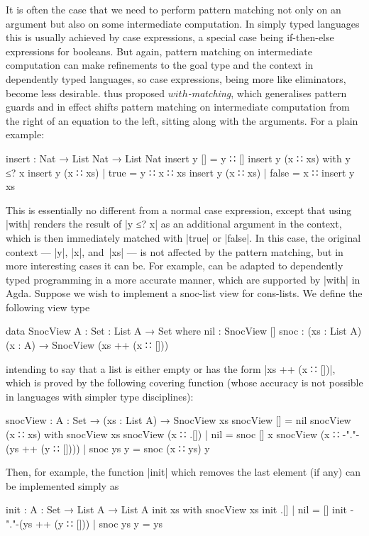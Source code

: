 It is often the case that we need to perform pattern matching not only on an argument but also on some intermediate computation.
In simply typed languages this is usually achieved by case expressions, a special case being if-then-else expressions for booleans.
But again, pattern matching on intermediate computation can make refinements to the goal type and the context in dependently typed languages, so case expressions, being more like eliminators, become less desirable.
\citet{McBride-view} thus proposed \emph{$with$-matching}, which generalises pattern guards and in effect shifts pattern matching on intermediate computation from the right of an equation to the left, sitting along with the arguments.
For a plain example:
\begin{code}
insert : Nat → List Nat → List Nat
insert y [] = y ∷ []
insert y (x ∷ xs) with y ≤? x
insert y (x ∷ xs) | true   = y ∷ x ∷ xs
insert y (x ∷ xs) | false  = x ∷ insert y xs
\end{code}
This is essentially no different from a normal case expression, except that using |with| renders the result of |y ≤? x| as an additional argument in the context, which is then immediately matched with |true| or |false|.
In this case, the original context --- |y|, |x|, and~|xs| --- is not affected by the pattern matching, but in more interesting cases it can be.
For example,  can be adapted to dependently typed programming in a more accurate manner, which are supported by |with| in Agda.
Suppose we wish to implement a snoc-list view for cons-lists.
We define the following view type
\begin{code}
data SnocView {A : Set} : List A → Set where
  nil   : SnocView []
  snoc  : (xs : List A) (x : A) → SnocView (xs ++ (x ∷ []))
\end{code}
intending to say that a list is either empty or has the form |xs ++ (x ∷ [])|, which is proved by the following covering function (whose accuracy is not possible in languages with simpler type disciplines):
\begin{code}
snocView : {A : Set} → (xs : List A) → SnocView xs
snocView [] = nil
snocView (x ∷ xs)                       with snocView xs
snocView (x ∷ .[])                      | nil        = snoc [] x
snocView (x ∷ {-"."-}(ys ++ (y ∷ [])))  | snoc ys y  = snoc (x ∷ ys) y
\end{code}
Then, for example, the function |init| which removes the last element (if any) can be implemented simply as
\begin{code}
init : {A : Set} → List A → List A
init xs                       with snocView xs
init .[]                      | nil        = []
init {-"."-}(ys ++ (y ∷ []))  | snoc ys y  = ys
\end{code}
